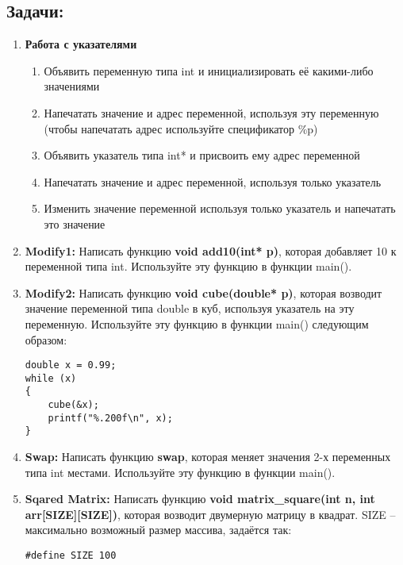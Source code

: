 \documentclass{article}
\begin{document}
\subsection*{Задачи:}
\begin{enumerate}
\item \textbf{Работа с указателями}
	\begin{enumerate}
	\item Объявить переменную типа int и инициализировать её какими-либо значениями
	\item Напечатать значение и адрес переменной, используя эту переменную (чтобы напечатать адрес используйте спецификатор \%p)
	\item Объявить указатель типа int* и присвоить ему адрес переменной
	\item Напечатать значение и адрес переменной, используя только указатель
	\item Изменить значение переменной используя только указатель и напечатать это значение
	\end{enumerate}

\item \textbf{Modify1:} Написать функцию \textbf{void add10(int* p)}, которая добавляет 10 к переменной типа int. Используйте эту функцию в функции main().

\item \textbf{Modify2:} Написать функцию \textbf{void cube(double* p)}, которая возводит значение переменной типа double в куб, используя указатель на эту переменную. Используйте эту функцию в функции main() следующим образом:
\begin{verbatim}
double x = 0.99;
while (x)
{
    cube(&x);
    printf("%.200f\n", x);
}

\end{verbatim}
\item \textbf{Swap:} Написать функцию \textbf{swap}, которая меняет значения 2-х переменных типа int местами. Используйте эту функцию в функции main().
\item \textbf{Sqared Matrix:} Написать функцию \textbf{void matrix\_square(int n, int arr[SIZE][SIZE])}, которая возводит двумерную матрицу в квадрат. SIZE -- максимально возможный размер массива, задаётся  так:
\begin{verbatim}
#define SIZE 100
\end{verbatim}
\end{enumerate}
\end{document}
